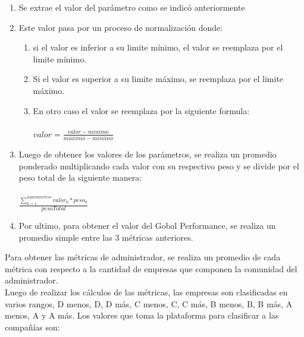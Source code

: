 \begin{enumerate}
	\item Se extrae el valor del parámetro como se indicó anteriormente
	\item Este valor pasa por un proceso de normalización donde:
	
	\begin{enumerate}
		\item si el valor es inferior a su limite mínimo, el valor se reemplaza por el limite mínimo.
		\item Si el valor es superior a su limite máximo, se reemplaza por el limite máximo.
		\item En otro caso el valor se reemplaza por la siguiente formula: \\\\
		$valor=\frac{valor - minimo}{maximo - minimo}$
	\end{enumerate}

	\item Luego de obtener los valores de los parámetros, se realiza un promedio ponderado multiplicando cada valor con su respectivo peso y se divide por el peso total de la siguiente manera: \\\\
	$\frac{\sum_{n = 1}^{\# parametros} valor_{n} * peso_{n}}{pesoTotal}$
	
	\item Por ultimo, para obtener el valor del Gobal Performance, se realiza un promedio simple entre las 3 métricas anteriores.
\end{enumerate}

Para obtener las métricas de administrador, se realiza un promedio de cada métrica con respecto a la cantidad de empresas que componen la comunidad del administrador.\\

Luego de realizar los cálculos de las métricas, las empresas son clasificadas en varios rangos, D menos, D, D más, C menos, C, C más, B menos, B, B más, A menos, A y A más. Los valores que toma la plataforma para clasificar a las compañías son: 

